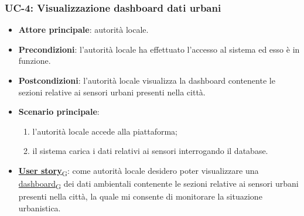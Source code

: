 \subsubsection{UC-4: Visualizzazione dashboard dati urbani}
\begin{itemize}
	\item \textbf{Attore principale}: autorità locale.
	\item \textbf{Precondizioni}: l'autorità locale ha effettuato l'accesso al sistema ed esso è in funzione.
	\item \textbf{Postcondizioni}: l'autorità locale visualizza la dashboard contenente le sezioni relative ai sensori urbani presenti nella città.
	\item \textbf{Scenario principale}:
	      \begin{enumerate}
		      \item l'autorità locale accede alla piattaforma;
		      \item il sistema carica i dati relativi ai sensori interrogando il database.
	      \end{enumerate}
	\item \href{https://7last.github.io/docs/pb/documentazione-interna/glossario\#user-story}{\textbf{User story}\textsubscript{G}}: come autorità locale desidero poter visualizzare una \href{https://7last.github.io/docs/pb/documentazione-interna/glossario\#dashboard}{dashboard\textsubscript{G}} dei dati ambientali contenente le sezioni relative ai sensori urbani presenti nella città, la quale mi consente di monitorare la situazione urbanistica.
\end{itemize}
\begin{center}
\end{center}

